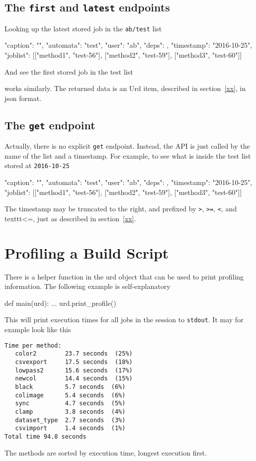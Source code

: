 \subsection{The \texttt{first} and \texttt{latest} endpoints}
Looking up the latest stored job in the \texttt{ab/test} list
\begin{shell}
{"caption": "", "automata": "test", "user": "ab", "deps": {},
  "timestamp": "2016-10-25", "joblist": [["method1", "test-56"],
  ["method2", "test-59"], ["method3", "test-60"]]}
\end{shell}
And see the first stored job in the test list
\begin{shell}
\end{shell}
works similarly.  The returned data is an Urd item, described in
section~\ref{xx}, in json format.



\subsection{The \texttt{get} endpoint}
Actually, there is no explicit \texttt{get} endpoint.  Instead, the
API is just called by the name of the list and a timestamp.  For
example, to see what is inside the test list stored
at \texttt{2016-10-25}
\begin{shell}
{"caption": "", "automata": "test", "user": "ab", "deps": {},
  "timestamp": "2016-10-25", "joblist": [["method1", "test-56"],
  ["method2", "test-59"], ["method3", "test-60"]]}
\end{shell}
The timestamp may be truncated to the right, and prefixed
by \texttt{>}, \texttt{>=}, \texttt{<}, and texttt{<=}, just as
described in section~\ref{xx}.



\section{Profiling a Build Script}
There is a helper function in the urd object that can be used to print
profiling information.  The following example is self-explanatory
\begin{python}
def main(urd):
    ...
    urd.print_profile()
\end{python}
This will print execution times for all jobs in the session
to \texttt{stdout}.  It may for example look like this
\begin{verbatim}
Time per method:
   color2        23.7 seconds  (25%)
   csvexport     17.5 seconds  (18%)
   lowpass2      15.6 seconds  (17%)
   newcol        14.4 seconds  (15%)
   black         5.7 seconds  (6%)
   colimage      5.4 seconds  (6%)
   sync          4.7 seconds  (5%)
   clamp         3.8 seconds  (4%)
   dataset_type  2.7 seconds  (3%)
   csvimport     1.4 seconds  (1%)
Total time 94.8 seconds
\end{verbatim}
The methods are sorted by execution time, longest execution first.


